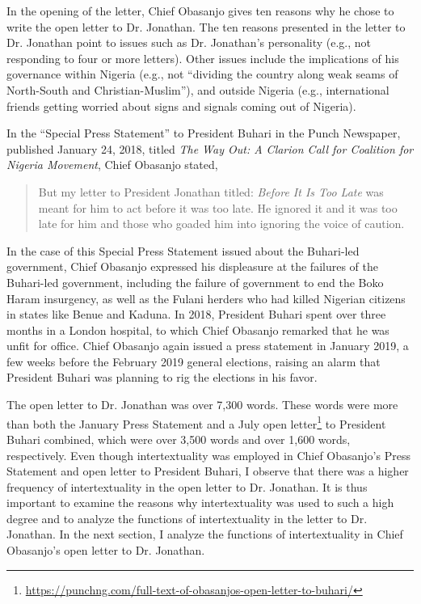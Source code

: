 \documentclass[output=paper,colorlinks,citecolor=brown]{langscibook}
\begin{document}
In the opening of the letter, Chief Obasanjo gives ten reasons why he chose to write the open letter to Dr. Jonathan. The ten reasons presented in the letter to Dr. Jonathan point to issues such as Dr. Jonathan’s personality (e.g., not responding to four or more letters). Other issues include the implications of his governance within Nigeria (e.g., not “dividing the country along weak seams of North-South and Christian-Muslim”), and outside Nigeria (e.g., international friends getting worried about signs and signals coming out of Nigeria). 

In the “Special Press Statement” to President Buhari in the Punch Newspaper, published January 24, 2018, titled \textit{The Way Out: A Clarion Call for Coalition for Nigeria Movement}, Chief Obasanjo stated,

\begin{quote}
    But my letter to President Jonathan titled: \textit{Before It Is Too Late} was meant for him to act before it was too late. He ignored it and it was too late for him and those who goaded him into ignoring the voice of caution.
\end{quote}

In the case of this Special Press Statement issued about the Buhari-led government, Chief Obasanjo expressed his displeasure at the failures of the Buhari-led government, including the failure of government to end the Boko Haram insurgency, as well as the Fulani herders who had killed Nigerian citizens in states like Benue and Kaduna. In 2018, President Buhari spent over three months in a London hospital, to which Chief Obasanjo remarked that he was unfit for office. Chief Obasanjo again issued a press statement in January 2019, a few weeks before the February 2019 general elections, raising an alarm that President Buhari was planning to rig the elections in his favor. 

The open letter to Dr. Jonathan was over 7,300 words. These words were more than both the January Press Statement and a July open letter\footnote{\url{https://punchng.com/full-text-of-obasanjos-open-letter-to-buhari/}} to President Buhari combined, which were over 3,500 words and over 1,600 words, respectively. Even though intertextuality was employed in Chief Obasanjo’s Press Statement and open letter to President Buhari, I observe that there was a higher frequency of intertextuality in the open letter to Dr. Jonathan. It is thus important to examine the reasons why intertextuality was used to such a high degree and to analyze the functions of intertextuality in the letter to Dr. Jonathan. In the next section, I analyze the functions of intertextuality in Chief Obasanjo’s open letter to Dr. Jonathan.
\end{document}
